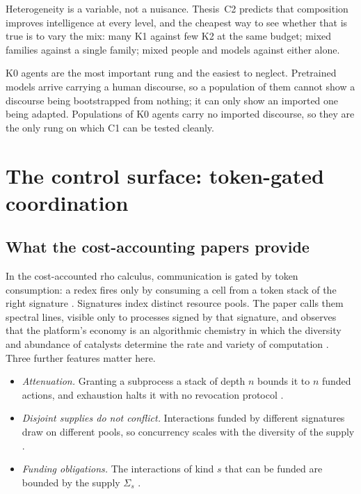 \documentclass[11pt,a4paper]{article}
\begin{document}
Heterogeneity is a variable, not a nuisance. Thesis~C2 predicts that composition improves
intelligence at every level, and the cheapest way to see whether that is true is to vary the mix:
many K1 against few K2 at the same budget; mixed families against a single family; mixed people
and models against either alone.

K0 agents are the most important rung and the easiest to neglect. Pretrained models arrive
carrying a human discourse, so a population of them cannot show a discourse being bootstrapped from
nothing; it can only show an imported one being adapted. Populations of K0 agents carry no imported
discourse, so they are the only rung on which C1 can be tested cleanly.

\section{The control surface: token-gated coordination}\label{sec:control}

\subsection{What the cost-accounting papers provide}

In the cost-accounted rho calculus, communication is gated by token consumption: a redex fires
only by consuming a cell from a token stack of the right signature \cite{cost-rho,cost-endo}.
Signatures index distinct resource pools. The paper calls them spectral lines, visible only to
processes signed by that signature, and observes that the platform's economy is an algorithmic
chemistry in which the diversity and abundance of catalysts determine the rate and variety of
computation \cite[\S5.6]{cost-rho}. Three further features matter here.
\begin{itemize}[itemsep=2pt]
\item \emph{Attenuation.} Granting a subprocess a stack of depth $n$ bounds it to $n$ funded actions,
  and exhaustion halts it with no revocation protocol \cite[\S2.4]{cost-rho}.
\item \emph{Disjoint supplies do not conflict.} Interactions funded by different signatures draw on
  different pools, so concurrency scales with the diversity of the supply \cite[\S2.3]{cost-rho}.
\item \emph{Funding obligations.} The interactions of kind $s$ that can be funded are bounded by the
  supply $\Sigma_s$ \cite[Def.~8.5]{cost-rho}.
\end{itemize}
\end{document}
